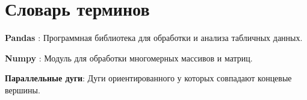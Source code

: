 \chapter*{Словарь терминов}             %

\textbf{Pandas} : Программная библиотека для обработки и анализа табличных данных.  

\textbf{Numpy} : Модуль для обработки многомерных массивов и матриц.

\textbf{Параллельные дуги}: Дуги ориентированного у которых совпадают концевые вершины.

